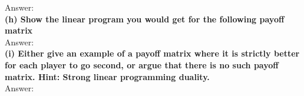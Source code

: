 \documentclass{article}
\begin{document}
Answer: \\ \newline
\textbf{(h) Show the linear program you would get for the following payoff matrix}\\ \newline
Answer: \\ \newline
\textbf{(i) Either give an example of a payoff matrix where it is strictly better for each player to go second, or argue that there is no such payoff matrix.
Hint: Strong linear programming duality.} \\ \newline
Answer: 
\end{document}
